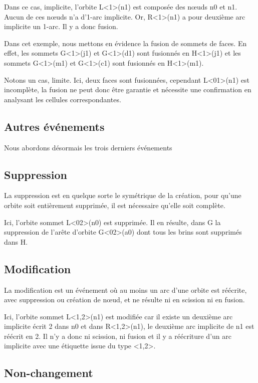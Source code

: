 \documentclass[a4paper]{article}
\begin{document}
Dans ce cas, implicite, l'orbite L<1>(n1) est composée des nœuds n0 et n1. Aucun
de ces nœuds n'a d'1-arc implicite. Or, R<1>(n1) a pour deuxième arc implicite
un 1-arc. Il y a donc fusion.

Dans cet exemple, nous mettons en évidence la fusion de sommets de faces. En
effet, les sommets G<1>(j1) et G<1>(d1) sont fusionnés en H<1>(j1) et les
sommets G<1>(m1) et G<1>(c1) sont fusionnés en H<1>(m1).

Notons un cas, limite. Ici, deux faces sont fusionnées, cependant L<01>(n1) est
incomplète, la fusion ne peut donc être garantie et nécessite une confirmation
en analysant les cellules correspondantes.

\subsection{Autres événements}

Nous abordons désormais les trois derniers événements

\subsection{Suppression}

La suppression est en quelque sorte le symétrique de la création, pour qu'une orbite soit entièrement supprimée, il est nécessaire qu'elle soit complète.

Ici, l'orbite sommet L<02>(n0) est supprimée. Il en résulte, dans G la
suppression de l'arête d'orbite G<02>(a0) dont tous les brins sont supprimés
dans H.

\subsection{Modification}

La modification est un événement où au moins un arc d'une orbite est réécrite,
avec suppression ou création de nœud, et ne résulte ni en scission ni en fusion.

Ici, l'orbite sommet L<1,2>(n1) est modifiée car il existe un deuxième arc
implicite écrit 2 dans n0 et dans R<1,2>(n1), le deuxième arc implicite de n1
est réécrit en 2. Il n'y a donc ni scission, ni fusion et il y a réécriture
d'un arc implicite avec une étiquette issue du type <1,2>.

\subsection{Non-changement}
\end{document}
